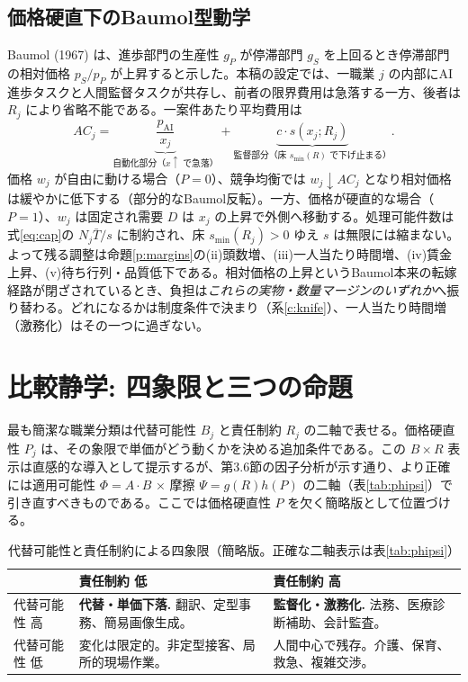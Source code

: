 \documentclass[11pt]{article}
\theoremstyle{plain}
\theoremstyle{definition}
\theoremstyle{remark}
\begin{document}
\subsection{価格硬直下のBaumol型動学}
Baumol (1967) は、進歩部門の生産性 $g_P$ が停滞部門 $g_S$ を上回るとき停滞部門の相対価格 $p_S/p_P$ が上昇すると示した。本稿の設定では、一職業 $j$ の内部にAI進歩タスクと人間監督タスクが共存し、前者の限界費用は急落する一方、後者は $R_j$ により省略不能である。一案件あたり平均費用は
\begin{equation}
AC_j=\underbrace{\frac{p_{\mathrm{AI}}}{x_j}}_{\text{自動化部分（}x\uparrow\text{ で急落）}}+\underbrace{c\cdot s(x_j;R_j)}_{\text{監督部分（床 }s_{\min}(R)\text{ で下げ止まる）}}.
\end{equation}
価格 $w_j$ が自由に動ける場合（$P=0$）、競争均衡では $w_j\downarrow AC_j$ となり相対価格は緩やかに低下する（部分的なBaumol反転）。一方、価格が硬直的な場合（$P=1$）、$w_j$ は固定され需要 $D$ は $x_j$ の上昇で外側へ移動する。処理可能件数は式\eqref{eq:cap}の $N_j\bar T/s$ に制約され、床 $s_{\min}(R_j)>0$ ゆえ $s$ は無限には縮まない。よって残る調整は命題\ref{p:margins}の(ii)頭数増、(iii)一人当たり時間増、(iv)賃金上昇、(v)待ち行列・品質低下である。相対価格の上昇というBaumol本来の転嫁経路が閉ざされているとき、負担は\emph{これらの実物・数量マージンのいずれか}へ振り替わる。どれになるかは制度条件で決まり（系\ref{c:knife}）、一人当たり時間増（激務化）はその一つに過ぎない。

\section{比較静学: 四象限と三つの命題}

最も簡潔な職業分類は代替可能性 $B_j$ と責任制約 $R_j$ の二軸で表せる。価格硬直性 $P_j$ は、その象限で単価がどう動くかを決める追加条件である。この $B\times R$ 表示は直感的な導入として提示するが、第3.6節の因子分析が示す通り、より正確には適用可能性 $\Phi=A\cdot B$ × 摩擦 $\Psi=g(R)h(P)$ の二軸（表\ref{tab:phipsi}）で引き直すべきものである。ここでは価格硬直性 $P$ を欠く簡略版として位置づける。

\begin{table}[h]\centering\small
\caption{代替可能性と責任制約による四象限（簡略版。正確な二軸表示は表\ref{tab:phipsi}）}\label{tab:quad}
\begin{tabularx}{\textwidth}{@{}lXX@{}}
\toprule
 & 責任制約 低 & 責任制約 高 \\ \midrule
代替可能性 高 & \textbf{代替・単価下落.} 翻訳、定型事務、簡易画像生成。 & \textbf{監督化・激務化.} 法務、医療診断補助、会計監査。 \\[2pt]
代替可能性 低 & 変化は限定的。非定型接客、局所的現場作業。 & 人間中心で残存。介護、保育、救急、複雑交渉。 \\
\bottomrule
\end{tabularx}
\end{table}
\end{document}
